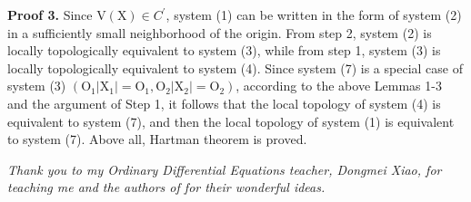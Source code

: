\documentclass[11pt]{diazessay} %
\begin{document}
\vskip 8pt
\textbf{Proof 3. }
Since $\mathrm{V}(\mathrm{X})\in C^{\prime}$, system (1) can be written in the form of system (2) in a sufficiently small neighborhood of the origin. From step 2, system (2) is locally topologically equivalent to system (3), while from step 1, system (3) is locally topologically equivalent to system (4). Since system (7) is a special case of system (3) $( \mathrm{O}_1\left|\mathrm{X}_1\right|=\mathrm{O}_1, \mathrm{O}_2\left|\mathrm{X}_2\right|=\mathrm{O}_2)$,  according to the above Lemmas 1-3 and the argument of Step 1, it follows that the local topology of system (4) is equivalent to system (7), and then the local topology of system (1) is equivalent to system (7).
Above all, Hartman theorem is proved.

\vskip 8pt
\textit{Thank you to my Ordinary Differential Equations teacher, Dongmei Xiao, for teaching me and the authors of \cite{3} \cite{4} \cite{5} for their wonderful ideas.}

%



\end{document}
